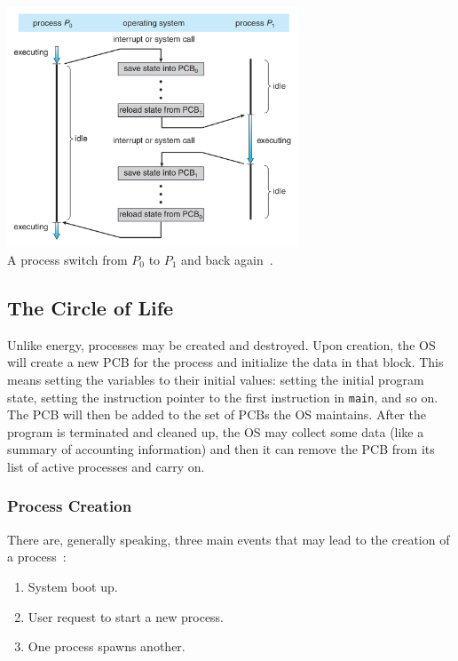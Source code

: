 \begin{center}
	\includegraphics[width=0.65\textwidth]{images/process-switch.png}\\
	A process switch from $P_{0}$ to $P_{1}$ and back again~\cite{osc}.
\end{center}

\subsection*{The Circle of Life}

Unlike energy, processes may be created and destroyed. Upon creation, the OS will create a new PCB for the process and initialize the data in that block. This means setting the variables to their initial values: setting the initial program state, setting the instruction pointer to the first instruction in \texttt{main}, and so on.  The PCB will then be added to the set of PCBs the OS maintains. After the program is terminated and cleaned up, the OS may collect some data (like a summary of accounting information) and then it can remove the PCB from its list of active processes and carry on.

\subsubsection*{Process Creation}
There are, generally speaking, three main events that may lead to the creation of a process~\cite{mos}:

\begin{enumerate}
	\item System boot up.
	\item User request to start a new process.
	\item One process spawns another.
\end{enumerate}

